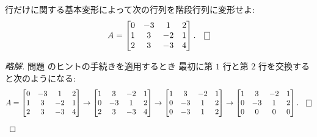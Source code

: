 \documentclass[12pt,twoside]{jarticle}
\newcommand\commentout[1]{#1}
\newcommand\commentout[1]{}
\begin{document}

\begin{question}[5点]
  \label{q:kaidan-2}
  行だけに関する基本変形によって次の行列を階段行列に変形せよ:
  \begin{equation*}
    A = 
    \begin{bmatrix}
      0 & -3 &  1 & 2 \\
      1 &  3 & -2 & 1 \\
      2 &  3 & -3 & 4 \\
    \end{bmatrix}.
    \qed
  \end{equation*}
\end{question}

\commentout{
\begin{proof}[略解]
  問題  のヒントの手続きを適用するとき
  最初に第 $1$ 行と第 $2$ 行を交換すると次のようになる:
  {\small
  \begin{equation*}
    A = 
    \begin{bmatrix}
      0 & -3 &  1 & 2 \\
      1 &  3 & -2 & 1 \\
      2 &  3 & -3 & 4 \\
    \end{bmatrix}
    \to
    \begin{bmatrix}
      1 &  3 & -2 & 1 \\
      0 & -3 &  1 & 2 \\
      2 &  3 & -3 & 4 \\
    \end{bmatrix}
    \to
    \begin{bmatrix}
      1 &  3 & -2 & 1 \\
      0 & -3 &  1 & 2 \\
      0 & -3 &  1 & 2 \\
    \end{bmatrix}
    \to 
    \begin{bmatrix}
      1 &  3 & -2 & 1 \\
      0 & -3 &  1 & 2 \\
      0 &  0 &  0 & 0 \\
    \end{bmatrix}.
    \qed
  \end{equation*}
  }
\end{proof}
}

\end{document}
